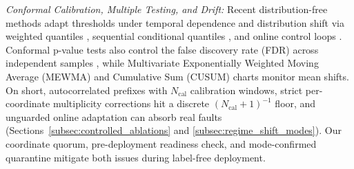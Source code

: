 \noindent\emph{Conformal Calibration, Multiple Testing, and Drift:} Recent distribution-free methods adapt thresholds under temporal dependence and distribution shift via weighted quantiles \cite{barber2023conformal}, sequential conditional quantiles \cite{xu2023spci}, and online control loops \cite{angelopoulos2023conformalpid}. Conformal p-value tests also control the false discovery rate (FDR) across independent samples \cite{bates2023testing}, while Multivariate Exponentially Weighted Moving Average (MEWMA) and Cumulative Sum (CUSUM) charts monitor mean shifts. On short, autocorrelated prefixes with $N_{\text{cal}}$ calibration windows, strict per-coordinate multiplicity corrections hit a discrete $(N_{\text{cal}}+1)^{-1}$ floor, and unguarded online adaptation can absorb real faults (Sections~\ref{subsec:controlled_ablations} and \ref{subsec:regime_shift_modes}). Our coordinate quorum, pre-deployment readiness check, and mode-confirmed quarantine mitigate both issues during label-free deployment.
